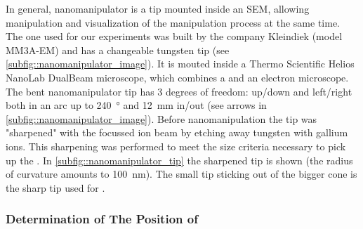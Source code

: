 	In general, nanomanipulator is a tip mounted inside an SEM, allowing manipulation and visualization of the manipulation process at the same time.
	The one used for our experiments was built by the company Kleindiek (model MM3A-EM) and has a changeable tungsten tip (see \cref{subfig::nanomanipulator_image}).
	It is mouted inside a Thermo Scientific\texttrademark{} Helios NanoLab\texttrademark{}  DualBeam\texttrademark{} microscope, which combines a \fib and an electron microscope.
	The bent nanomanipulator tip has 3 degrees of freedom: up/down and left/right both in an arc up to \SI{240}{\degree} and \SI{12}{\milli\metre} in/out (see arrows in \cref{subfig::nanomanipulator_image}). 
	Before nanomanipulation the tip was "sharpened" with the focussed ion beam by etching away  tungsten with gallium ions.
	This sharpening was performed to meet the size criteria necessary to pick up the \nds.
	In \cref{subfig::nanomanipulator_tip} the sharpened tip is shown (the radius of curvature amounts to \SI{100}{\nano\meter}).
	The small tip sticking out of the bigger cone is the sharp tip used for \pp.


	\subsubsection{Determination of The Position of \Nds}


